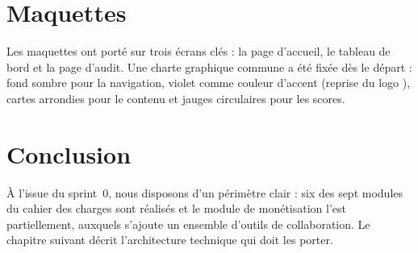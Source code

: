 \section{Maquettes}
Les maquettes ont porté sur trois écrans clés : la page d'accueil, le tableau de bord et la page d'audit. Une charte graphique commune a été fixée dès le départ : fond sombre pour la navigation, violet comme couleur d'accent (reprise du logo \xapp), cartes arrondies pour le contenu et jauges circulaires pour les scores. 

\section{Conclusion}
À l'issue du sprint~0, nous disposons d'un périmètre clair : six des sept modules du cahier des charges sont réalisés et le module de monétisation l'est partiellement, auxquels s'ajoute un ensemble d'outils de collaboration. Le chapitre suivant décrit l'architecture technique qui doit les porter.
